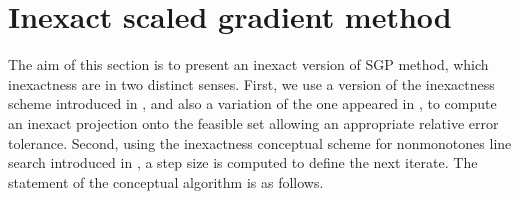\chapter{Inexact scaled gradient method} \label{chap:SGM}

The aim of this section is to present an  inexact  version of SGP method, which   inexactness are in two distinct senses.  First,  we  use  a version of the inexactness scheme introduced in \cite{BirginMartinezRaydan2003},  and also a variation of the one appeared in \cite{VillaSalzo2013},  to compute an inexact projection  onto the feasible  set   allowing an appropriate  relative error tolerance. Second,  using the  inexactness  conceptual scheme for  nonmonotones    line  search   introduced  in  \cite{GrapigliaSachs2017, SachsSachs2011}, a step size is computed  to define the next iterate.  The statement of the  conceptual algorithm is as follows.\\

